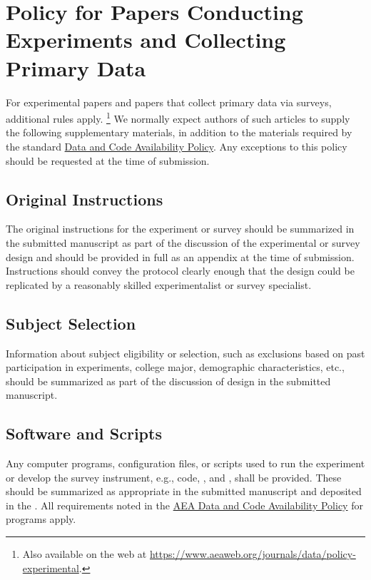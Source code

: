 \section{Policy for Papers Conducting Experiments and Collecting Primary  Data}\label{policy-for-papers-conducting-experiments-and-collecting-primary-data}

For experimental papers and papers that collect primary data via
surveys, additional rules apply.%
\footnote{Also available on the web at 
	\url{https://www.aeaweb.org/journals/data/policy-experimental}.}
We normally expect authors of such
articles to supply the following supplementary materials, in addition to
the materials required by the standard \hyperref[data-and-code-availability-policy]{Data and Code
Availability Policy}. Any exceptions to this policy should be requested
at the time of submission.

\subsection{Original Instructions}\label{original-instructions}

The original instructions for the experiment or survey should be
summarized in the submitted manuscript as part of the discussion of the
experimental or survey design and should be provided in full as an
appendix at the time of submission. Instructions should convey the
protocol clearly enough that the design could be replicated by a
reasonably skilled experimentalist or survey specialist.

\subsection{Subject Selection}\label{subject-selection}

Information about subject eligibility or selection, such as exclusions
based on past participation in experiments, college major, demographic
characteristics, etc., should be summarized as part of the discussion of
design in the submitted manuscript.

\subsection{Software and Scripts}\label{software-and-scripts}

Any computer programs, configuration files, or scripts used to run the
experiment or develop the survey instrument, e.g.,
 code,
,
and , shall be provided.
These should be summarized as appropriate in the submitted manuscript
and deposited in the . All requirements noted in the
\hyperref[data-and-code-availability-policy]{AEA Data and Code Availability Policy} for programs
apply.


